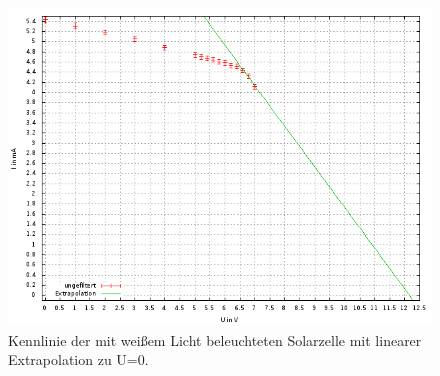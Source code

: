 \begin{figure}
\includegraphics[scale=0.6]{Auswertung/ungefiltert.png}
\caption{Kennlinie der mit weißem Licht beleuchteten Solarzelle mit linearer Extrapolation zu U=0.\label{unge}}
\end{figure}


